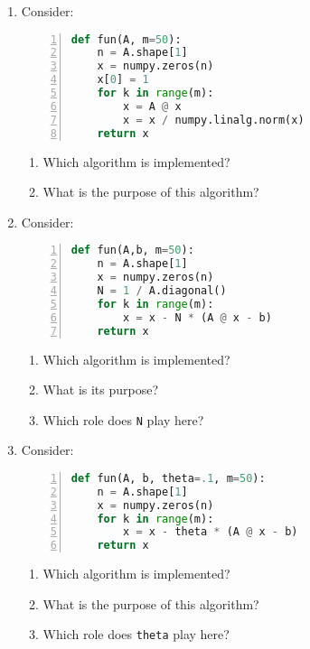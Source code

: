 \begin{enumerate}
\item Consider:
\begin{lstlisting}[language=python,numbers=left]
def fun(A, m=50):
	n = A.shape[1]
	x = numpy.zeros(n)
	x[0] = 1	
	for k in range(m):
		x = A @ x
		x = x / numpy.linalg.norm(x)
	return x
\end{lstlisting}
\begin{enumerate}
	\item Which algorithm is implemented? 
	\item What is the purpose of this algorithm?
\end{enumerate}
	\item Consider:
\begin{lstlisting}[language=python,numbers=left]
def fun(A,b, m=50):
    n = A.shape[1]
    x = numpy.zeros(n)
    N = 1 / A.diagonal()		
    for k in range(m):
        x = x - N * (A @ x - b)
    return x
\end{lstlisting}
	\begin{enumerate}
		\item Which algorithm is implemented?
		\item What is its purpose? 
		\item Which role does \verb|N| play here?
	\end{enumerate}

\item Consider:
\begin{lstlisting}[language=python,numbers=left]
def fun(A, b, theta=.1, m=50):
    n = A.shape[1]
    x = numpy.zeros(n)		
    for k in range(m):
        x = x - theta * (A @ x - b)
    return x
\end{lstlisting}
\begin{enumerate}
	\item Which algorithm is implemented? 
	\item What is the purpose of this algorithm?
	\item Which role does \verb|theta| play here?
\end{enumerate}
\end{enumerate}
 